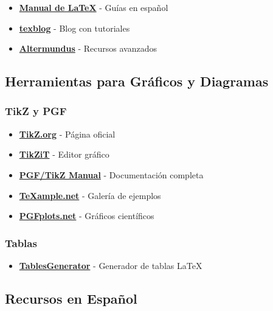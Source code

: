 \documentclass[
  jou,
  floatsintext,
  longtable,
  a4paper,
  nolmodern,
  notxfonts,
  notimes,
  12pt,
  colorlinks=true,linkcolor=blue,citecolor=blue,urlcolor=blue]{apa7}
\providecommand{\tightlist}{%
  \setlength{\itemsep}{0pt}\setlength{\parskip}{0pt}}
\begin{document}
\begin{itemize}
\tightlist
\item
  \textbf{\href{https://manualdelatex.com/tutoriales}{Manual de LaTeX}}
  - Guías en español
\item
  \textbf{\href{https://texblog.org/about/}{texblog}} - Blog con
  tutoriales
\item
  \textbf{\href{https://altermundus.fr/}{Altermundus}} - Recursos
  avanzados
\end{itemize}

\subsection{Herramientas para Gráficos y
Diagramas}\label{herramientas-para-gruxe1ficos-y-diagramas}

\subsubsection{TikZ y PGF}\label{tikz-y-pgf}

\begin{itemize}
\tightlist
\item
  \textbf{\href{https://tikz.org/}{TikZ.org}} - Página oficial
\item
  \textbf{\href{https://tikzit.github.io/}{TikZiT}} - Editor gráfico
\item
  \textbf{\href{https://tikz.dev/}{PGF/TikZ Manual}} - Documentación
  completa
\item
  \textbf{\href{https://texample.net/}{TeXample.net}} - Galería de
  ejemplos
\item
  \textbf{\href{https://pgfplots.net/}{PGFplots.net}} - Gráficos
  científicos
\end{itemize}

\subsubsection{Tablas}\label{tablas}

\begin{itemize}
\tightlist
\item
  \textbf{\href{https://www.tablesgenerator.com/}{TablesGenerator}} -
  Generador de tablas LaTeX
\end{itemize}

\subsection{Recursos en Español}\label{recursos-en-espauxf1ol}
\end{document}
